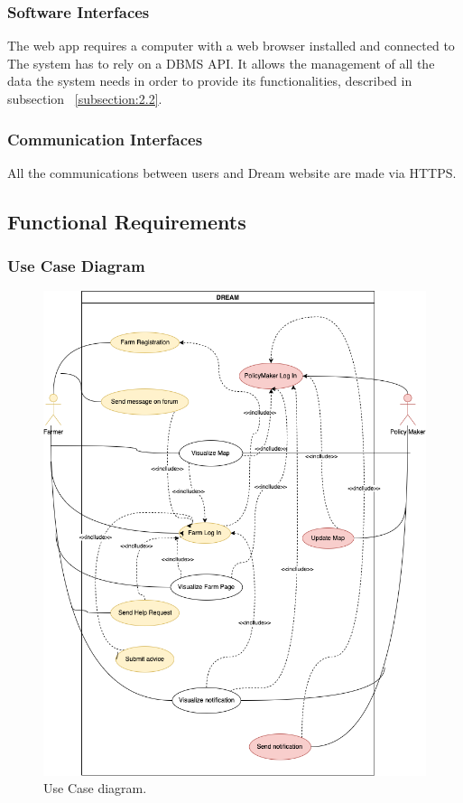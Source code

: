 \subsubsection{Software Interfaces}
The web app requires a computer with a web browser installed and connected to 
The system has to rely on a DBMS API. It allows the management of all the data the system 
needs in order to provide its functionalities, described in subsection ~\ref{subsection:2.2}.

\subsubsection{Communication Interfaces}
All the communications between users and Dream website are made via HTTPS.

\newpage

\subsection{Functional Requirements}
\subsubsection{Use Case Diagram}
\begin{figure}[H]
    \begin{center}
    \includegraphics[width=1\textwidth]{images/useCaseDiag.drawio.png}
    \caption{Use Case diagram.}
    \label{fig:state9}
    \end{center}
\end{figure}
